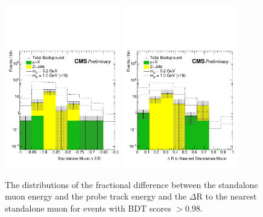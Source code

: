 \begin{figure}[htbp]
	\centering
	\includegraphics[width=0.45\textwidth]{figures/partDisappStaDE.pdf}
	\hspace{0.01\textwidth}
	\includegraphics[width=0.45\textwidth]{figures/partDisappStaDr.pdf}
	\caption[Expected Partial Disappearance Standalone Muon Features]{The distributions of the fractional difference between the standalone muon energy and the probe track energy and the $\Delta$R to the nearest standalone muon for events with BDT scores $>$0.98.}
	\label{fig:partSta}
\end{figure}

